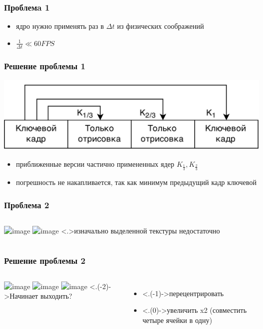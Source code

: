\documentclass{beamer} %
\theoremstyle{definition} %
\begin{document}
\begin{frame}
\frametitle{Проблемa 1}
\begin{itemize}
  \item{ядро нужно применять раз в $\Delta t$ из физических соображений}
  \item{$\frac{1}{\Delta t} \ll 60FPS$} 
\end{itemize}
\end{frame}

\begin{frame}
\frametitle{Решение проблемы 1}
\includegraphics[width=\textwidth]{pics/keyframe.png} 
\begin{itemize}
  \item{приближенные версии частично примененных ядер $K_{\frac{1}{3}}, K_{\frac{2}{3}}$}
  \item{погрешность не накапливается, так как минимум предыдущий кадр ключевой}
\end{itemize}
\end{frame}

\begin{frame}
  \frametitle{Проблема 2}
\begin{columns}
\includegraphics<+>[width=\textwidth]{pics/pic07-1.png}
\includegraphics<+>[width=\textwidth]{pics/pic07-2.png}
\only<.>{изначально выделенной текстуры недостаточно}
\end{columns}
\end{frame}

\begin{frame}
  \frametitle{Решение проблемы 2}
\begin{columns}
\includegraphics<+>[width=\textwidth]{pics/pic07-3.png}
\includegraphics<+>[width=\textwidth]{pics/pic07-4.png}
\includegraphics<+>[width=\textwidth]{pics/pic07-5.png}
\only<.(-2)->{Начинает выходить?}
\begin{itemize}
  \item<.(-1)->{перецентрировать}
  \item<.(0)->{увеличить x2 (совместить четыре ячейки в одну)}
\end{itemize}
\end{columns}
\end{frame}
\end{document}

